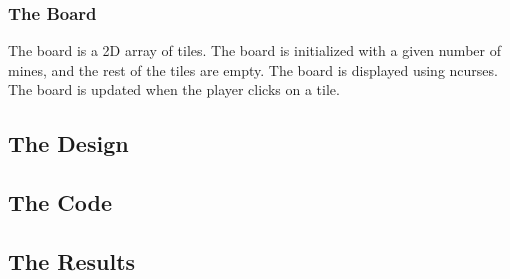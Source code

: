\documentclass{article}
\begin{document}


\subsubsection{The Board}

The board is a 2D array of tiles. The board is initialized with a given number
of mines, and the rest of the tiles are empty. The board is displayed using
ncurses. The board is updated when the player clicks on a tile.


\subsection{The Design}

\subsection{The Code}

\subsection{The Results}
\end{document}
